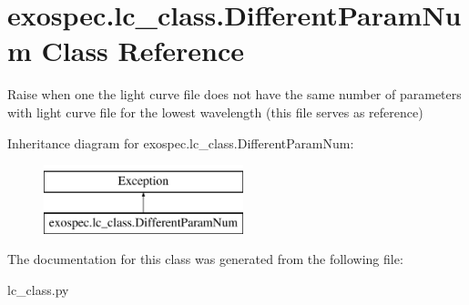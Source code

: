 \hypertarget{classexospec_1_1lc__class_1_1_different_param_num}{}\section{exospec.\+lc\+\_\+class.\+Different\+Param\+Num Class Reference}
\label{classexospec_1_1lc__class_1_1_different_param_num}


Raise when one the light curve file does not have the same number of parameters with light curve file for the lowest wavelength (this file serves as reference)  


Inheritance diagram for exospec.\+lc\+\_\+class.\+Different\+Param\+Num\+:\begin{figure}[H]
\begin{center}
\leavevmode
\includegraphics[height=2.000000cm]{classexospec_1_1lc__class_1_1_different_param_num}
\end{center}
\end{figure}


The documentation for this class was generated from the following file\+:\begin{DoxyCompactItemize}
\item 
lc\+\_\+class.\+py\end{DoxyCompactItemize}
